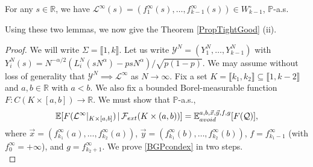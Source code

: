 \begin{lemma}\label{inftydistinct}
	For any $s\in\mathbb{R}$, we have $\mathcal{L}^\infty(s) = (f_1^\infty(s),\dots,f_{k-1}^\infty(s)) \in W^\circ_{k-1}$, $\mathbb{P}$-a.s.
\end{lemma}

Using these two lemmas, we now give the Theorem \ref{PropTightGood} (ii).

\begin{proof}
	We will write $\Sigma = \llbracket 1,k\rrbracket$. Let us write $\mathcal{Y}^N = (Y^N_1,\dots,Y^N_{k-1})$ with $Y^N_i(s) = N^{-\alpha/2}(L^N_i(sN^\alpha)-psN^\alpha)/\sqrt{p(1-p)}$. We may assume without loss of generality that $\mathcal{Y}^N \implies \mathcal{L}^\infty$ as $N\to\infty$. Fix a set $K = \llbracket k_1,k_2\rrbracket \subseteq \llbracket 1, k-2\rrbracket$ and $a,b\in\mathbb{R}$ with $a<b$. We also fix a bounded Borel-measurable function $F:C(K\times[a,b])\to\mathbb{R}$. We must show that $\mathbb{P}$-a.s.,
	\begin{equation}\label{BGPcondex}
		\mathbb{E}[F(\mathcal{L}^\infty|_{K\times[a,b]})\,|\,\mathcal{F}_{ext}(K\times(a,b))] = \mathbb{E}^{a,b,\vec{x},\vec{y},f,g}_{avoid}[F(\mathcal{Q})],
	\end{equation}
	where $\vec{x} = (f^\infty_{k_1}(a),\dots,f^\infty_{k_2}(a))$, $\vec{y} = (f^\infty_{k_1}(b),\dots,f^\infty_{k_2}(b))$, $f=f^\infty_{k_1-1}$ (with $f^\infty_0 = +\infty$), and $g=f^\infty_{k_2+1}$. We prove \eqref{BGPcondex} in two steps.\\
	

\end{proof}
